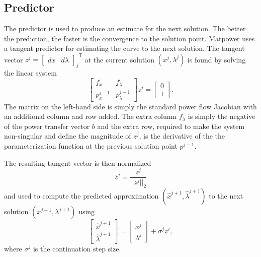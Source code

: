 \documentclass[12pt]{article}
\newcommand{\matpower}[0]{{\sc Matpower}}
\newcommand{\trans}[1]{{#1}^{\ensuremath{\mathsf{T}}}}  %
\numberwithin{equation}{section}
\numberwithin{table}{section}
\numberwithin{figure}{section}
\begin{document}
\subsection{Predictor}
The predictor is used to produce an estimate for the next solution. The better the prediction, the faster is the convergence to the solution point. \matpower{} uses a tangent predictor for estimating the curve to the next solution. The tangent vector $z^j = \trans{\left[ \begin{array}{cc}dx & d\lambda \end{array} \right]_j}$ at the current solution $(x^j,\lambda^j)$ is found by solving the linear system
\begin{equation}
\left[ \begin{array}{cc}
  f_x & f_\lambda \\
  p^{j-1}_x & p^{j-1}_\lambda
\end{array} \right] z^j =
\left[ \begin{array}{c}
  0 \\
  1  \end{array} \right].
\label{eq:tangent_predictor}
\end{equation}
The matrix on the left-hand side is simply the standard power flow Jacobian with an additional column and row added. The extra column $f_\lambda$ is simply the negative of the power transfer vector $b$ and the extra row, required to make the system non-singular and define the magnitude of $z^j$, is the derivative of the the parameterization function at the previous solution point $p^{j-1}$.

The resulting tangent vector is then normalized
\begin{equation}
\bar{z}^j = \frac{z^j}{|| z^j ||_2}
\end{equation}
and used to compute the predicted approximation $(\hat{x}^{j+1},\hat{\lambda}^{j+1})$ to the next solution $\left({x}^{j+1},{\lambda}^{j+1}\right)$ using
\begin{equation}
\left[\begin{array}{c}\hat{x}^{j+1} \\ \hat{\lambda}^{j+1}\end{array}\right] = 
\left[\begin{array}{c}x^j \\ \lambda^j \end{array}\right] + \sigma^j \bar{z}^j,
\end{equation}
where $\sigma^j$ is the continuation step size.
\end{document}
